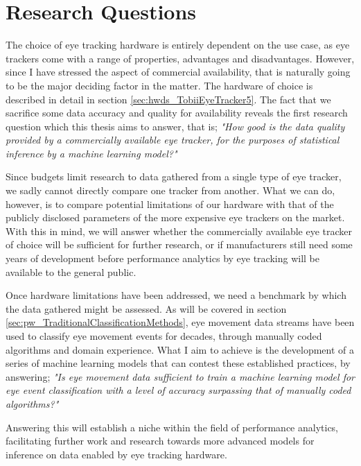 \section{Research Questions} \label{sec:intro_research}

The choice of eye tracking hardware is entirely dependent on the use case, as eye trackers come with a range of properties, advantages and disadvantages. However, since I have stressed the aspect of commercial availability, that is naturally going to be the major deciding factor in the matter. The hardware of choice is described in detail in section \ref{sec:hwds_TobiiEyeTracker5}. The fact that we sacrifice some data accuracy and quality for availability reveals the first research question which this thesis aims to answer, that is; \textit{"How good is the data quality provided by a commercially available eye tracker, for the purposes of statistical inference by a machine learning model?"}

Since budgets limit research to data gathered from a single type of eye tracker, we sadly cannot directly compare one tracker from another. What we can do, however, is to compare potential limitations of our hardware with that of the publicly disclosed parameters of the more expensive eye trackers on the market. With this in mind, we will answer whether the commercially available eye tracker of choice will be sufficient for further research, or if manufacturers still need some years of development before performance analytics by eye tracking will be available to the general public.

Once hardware limitations have been addressed, we need a benchmark by which the data gathered might be assessed. As will be covered in section \ref{sec:pw_TraditionalClassificationMethods}, eye movement data streams have been used to classify eye movement events for decades, through manually coded algorithms and domain experience. What I aim to achieve is the development of a series of machine learning models that can contest these established practices, by answering; \textit{"Is eye movement data sufficient to train a machine learning model for eye event classification with a level of accuracy surpassing that of manually coded algorithms?"} 

Answering this will establish a niche within the field of performance analytics, facilitating further work and research towards more advanced models for inference on data enabled by eye tracking hardware.